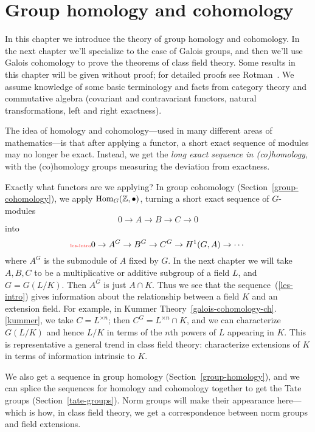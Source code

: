 \chapter{Group homology and cohomology}
In this chapter we introduce the theory of group homology and cohomology. In the next chapter we'll specialize to the case of Galois groups, and then we'll use Galois cohomology to prove the theorems of class field theory. Some results in this chapter will be given without proof; for detailed proofs see Rotman~\cite{Ro09}. We assume knowledge of some basic terminology and facts from category theory and commutative algebra (covariant and contravariant functors, natural transformations, left and right exactness).

The idea of homology and cohomology---used in many different areas of mathematics---is that after applying a functor, a short exact sequence of modules may no longer be exact. Instead, we get the {\it long exact sequence in (co)homology}, with the (co)homology groups measuring the deviation from exactness.

Exactly what functors are we applying? In group cohomology (Section~\ref{group-cohomology}), we apply $\operatorname{Hom}_G(\mathbb{Z},\bullet)$, turning a short exact sequence of $G$-modules
\[
0\to A \to B\to C\to 0
\]
into
\begin{equation}\llabel{les-intro}
0\to A^G\to B^G \to C^G\to H^1(G,A)\to  \cdots
\end{equation}
where $A^G$ is the submodule of $A$ fixed by $G$. In the next chapter we will take $A,B,C$ to be a multiplicative or additive subgroup of a field $L$, and $G=G(L/K)$. Then $A^G$ is just $A\cap K$. Thus we see that the sequence~(\ref{les-intro}) gives information about the relationship between a field $K$ and an extension field. For example, in Kummer Theory~\ref{galois-cohomology-ch}.\ref{kummer}, we take $C=L^{\times n}$; then $C^G=L^{\times n}\cap K$, and we can characterize $G(L/K)$ and hence $L/K$ in terms of the $n$th powers of $L$ appearing in $K$. This is representative a general trend in class field theory: characterize extensions of $K$ in terms of information intrinsic to $K$.

We also get a sequence in group homology (Section~\ref{group-homology}), and we can splice the sequences for homology and cohomology together to get the Tate groups (Section~\ref{tate-groups}). Norm groups will make their appearance here---which is how, in class field theory, we get a correspondence between norm groups and field extensions.


